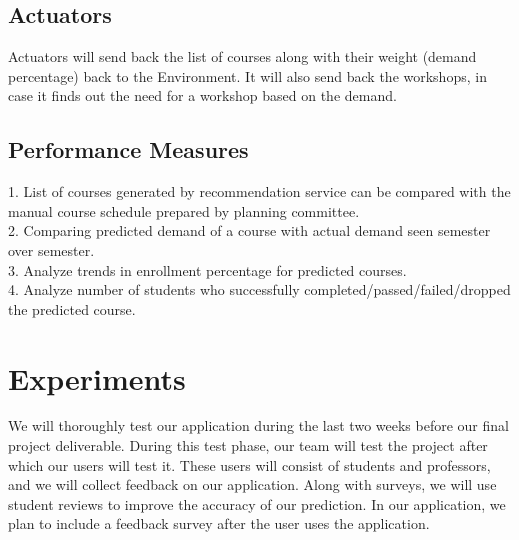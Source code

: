 \documentclass{article}
\begin{document}
\subsection{Actuators}
Actuators will send back the list of courses along with their weight (demand percentage) back to the Environment. It will also send back the workshops, in case it finds out the need for a workshop based on the demand.

\subsection{Performance Measures}
1. List of courses generated by recommendation service can be compared with the manual course schedule prepared by planning committee.\\
2. Comparing predicted demand of a course with actual demand seen semester over semester.\\
3. Analyze trends in enrollment percentage for predicted courses.\\
4. Analyze number of students who successfully completed/passed/failed/dropped the predicted course.\\ 

\section{Experiments}
We will thoroughly test our application during the last two weeks before our final project deliverable. During this test phase, our team will test the project after which our users will test it. These users will consist of students and professors, and we will collect feedback on our application. Along with surveys, we will use student reviews to improve the accuracy of our prediction. In our application, we plan to include a feedback survey after the user uses the application. 

 

\end{document}
